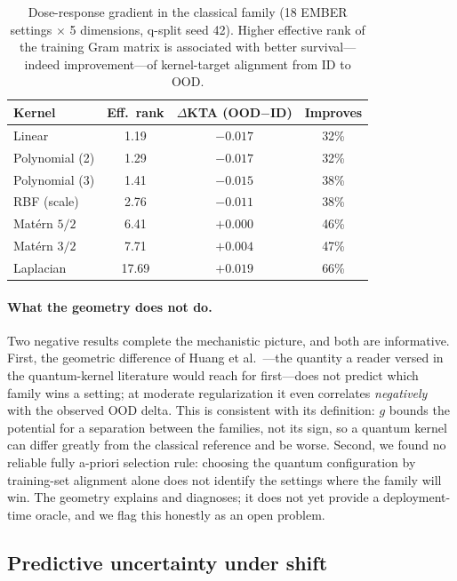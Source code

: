 \documentclass[journal]{IEEEtran}
\begin{document}
\begin{table}[t]
\centering
\caption{Dose-response gradient in the classical family (18 EMBER settings $\times$ 5 dimensions, q-split seed 42). Higher effective rank of the training Gram matrix is associated with better survival---indeed improvement---of kernel-target alignment from ID to OOD.}
\label{tab:dose_response}
\footnotesize
\setlength{\tabcolsep}{4pt}
\begin{tabular}{lccc}
\toprule
Kernel & Eff.\ rank & $\Delta$KTA (OOD$-$ID) & Improves \\
\midrule
Linear & 1.19 & $-0.017$ & 32\% \\
Polynomial (2) & 1.29 & $-0.017$ & 32\% \\
Polynomial (3) & 1.41 & $-0.015$ & 38\% \\
RBF (scale) & 2.76 & $-0.011$ & 38\% \\
Mat\'ern $5/2$ & 6.41 & $+0.000$ & 46\% \\
Mat\'ern $3/2$ & 7.71 & $+0.004$ & 47\% \\
Laplacian & 17.69 & $+0.019$ & 66\% \\
\bottomrule
\end{tabular}
\end{table}

\paragraph{What the geometry does not do.}
Two negative results complete the mechanistic picture, and both are informative. First, the geometric difference of Huang et al.\ \cite{huang2021powerofdata}---the quantity a reader versed in the quantum-kernel literature would reach for first---does not predict which family wins a setting; at moderate regularization it even correlates \emph{negatively} with the observed OOD delta. This is consistent with its definition: $g$ bounds the potential for a separation between the families, not its sign, so a quantum kernel can differ greatly from the classical reference and be worse. Second, we found no reliable fully a-priori selection rule: choosing the quantum configuration by training-set alignment alone does not identify the settings where the family will win. The geometry explains and diagnoses; it does not yet provide a deployment-time oracle, and we flag this honestly as an open problem.

\subsection{Predictive uncertainty under shift}
\label{sec:res_uncertainty}
\end{document}
